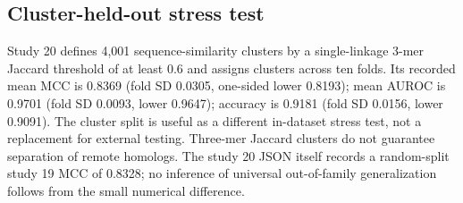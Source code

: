 \subsection{Cluster-held-out stress test}
Study 20 defines 4,001 sequence-similarity clusters by a single-linkage 3-mer Jaccard threshold of at least 0.6 and assigns clusters across ten folds. Its recorded mean MCC is 0.8369 (fold SD 0.0305, one-sided lower 0.8193); mean AUROC is 0.9701 (fold SD 0.0093, lower 0.9647); accuracy is 0.9181 (fold SD 0.0156, lower 0.9091). The cluster split is useful as a different in-dataset stress test, not a replacement for external testing. Three-mer Jaccard clusters do not guarantee separation of remote homologs. The study 20 JSON itself records a random-split study 19 MCC of 0.8328; no inference of universal out-of-family generalization follows from the small numerical difference.
